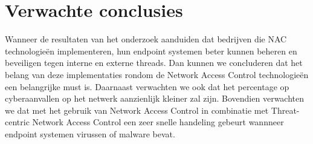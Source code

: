 \section{Verwachte conclusies}
\label{sec:verwachte_conclusies}
Wanneer de resultaten van het onderzoek aanduiden dat bedrijven die NAC technologieën implementeren, hun endpoint systemen beter kunnen beheren en beveiligen tegen interne en externe threads. Dan kunnen we concluderen dat het belang van deze implementaties rondom de Network Access Control technologieën een belangrijke must is. Daarnaast verwachten we ook dat het percentage op cyberaanvallen op het netwerk aanzienlijk kleiner zal zijn. Bovendien verwachten we dat met het gebruik van Network Access Control in combinatie met Threat-centric Network Access Control een zeer snelle handeling gebeurt wannneer endpoint systemen virussen of malware bevat.


